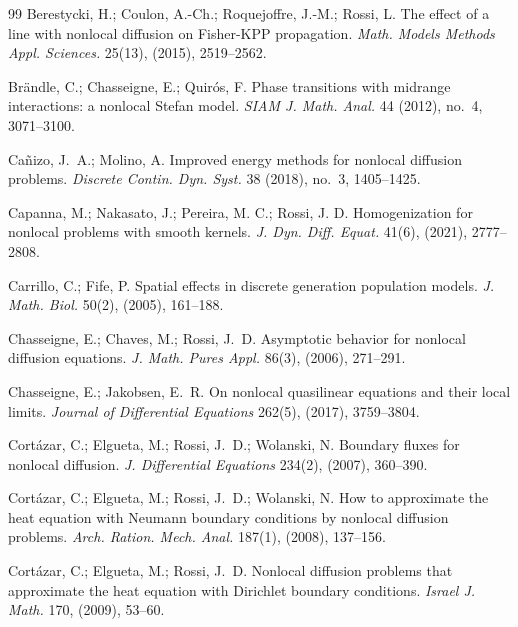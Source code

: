 \documentclass[reqno]{amsart}
\numberwithin{equation}{section}
\begin{document}
\begin{thebibliography}{99}
Berestycki, H.; Coulon, A.-Ch.; Roquejoffre, J.-M.; Rossi, L.
{The effect of a line with nonlocal diffusion on Fisher-KPP propagation}.
{\it Math. Models Methods Appl. Sciences.} 25(13), (2015), 2519--2562.

Br\"andle, C.; Chasseigne, E.; Quir\'os, F.
Phase transitions with midrange interactions: a nonlocal Stefan model.
\emph{SIAM J. Math. Anal.} 44 (2012), no.~4, 3071--3100.

Ca\~nizo, J.~A.; Molino, A.
Improved energy methods for nonlocal diffusion problems.
\emph{Discrete Contin. Dyn. Syst.} 38 (2018), no.~3, 1405--1425.

Capanna, M.; Nakasato, J.; Pereira, M. C.; Rossi, J. D.
Homogenization for nonlocal problems with smooth kernels.
\emph{J. Dyn. Diff. Equat.} 41(6), (2021), 2777--2808.

Carrillo, C.; Fife, P.
Spatial effects in discrete generation population models.
\emph{J. Math. Biol.} 50(2), (2005), 161--188.

Chasseigne, E.; Chaves, M.; Rossi, J.~D.
Asymptotic behavior for nonlocal diffusion equations.
\emph{J. Math. Pures Appl.} 86(3), (2006), 271--291.

Chasseigne, E.; Jakobsen, E.~R.
On nonlocal quasilinear equations and their local limits.
\emph{Journal of Differential Equations} 262(5), (2017), 3759--3804.

Cort\'azar, C.; Elgueta, M.; Rossi, J.~D.; Wolanski, N.
Boundary fluxes for nonlocal diffusion.
\emph{J. Differential Equations} 234(2), (2007), 360--390.

Cort\'azar, C.; Elgueta, M.; Rossi, J.~D.; Wolanski, N.
How to approximate the heat equation with Neumann boundary conditions by nonlocal diffusion problems.
\emph{Arch. Ration. Mech. Anal.} 187(1), (2008), 137--156.

Cort\'azar, C.; Elgueta, M.; Rossi, J.~D.
Nonlocal diffusion problems that approximate the heat equation with Dirichlet boundary conditions.
\emph{Israel J. Math.} 170, (2009), 53--60.


\end{thebibliography}
\end{document}

